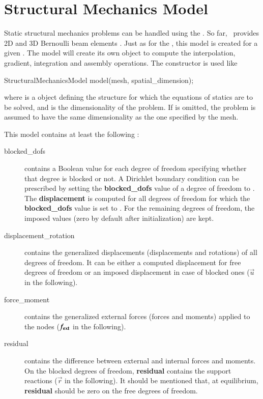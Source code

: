 \chapter{Structural  Mechanics   Model}
Static structural mechanics problems can be handled using the
.  So far, \akantu\ provides 2D and 3D
Bernoulli beam elements \cite{frey2009}.  Just as for the
, this model is created for a given
.  The model will create its own  object to
compute the interpolation, gradient, integration and assembly
operations.  The  constructor is used
like

\begin{cpp}
  StructuralMechanicsModel model(mesh, spatial_dimension);
\end{cpp}
where  is a  object defining the structure for
which the equations of statics are to be solved, and
 is the dimensionality of the problem.  If
 is omitted, the problem is assumed to have
the same dimensionality as the one specified by the mesh.



\vspace{1cm}
This model contains at least the following :
\begin{description}
\item[blocked\_dofs] contains a Boolean value for each degree of
  freedom specifying whether that degree is blocked or not. A
  Dirichlet boundary condition can be prescribed by setting the
  \textbf{blocked\_dofs} value of a degree of freedom to
  . The \textbf{displacement} is computed for all degrees
  of freedom for which the \textbf{blocked\_dofs} value is set to
  . For the remaining degrees of freedom, the imposed
  values (zero by default after initialization) are kept.



\item[displacement\_rotation] contains the generalized displacements
  (displacements and rotations) of all degrees of freedom. It can be
  either a computed displacement for free degrees of freedom or an
  imposed displacement in case of blocked ones ($\vec{u}$ in the
  following).

\item[force\_moment] contains the generalized external forces (forces
  and moments) applied to the nodes ($\boldsymbol{f_{{\mathrm{ext}}}}$ in the
  following).

\item[residual] contains the difference between external and internal
  forces and moments. On the blocked degrees of freedom,
  \textbf{residual} contains the support reactions ($\vec{r}$ in the
  following).  It should be mentioned that, at equilibrium,
  \textbf{residual} should be zero on the free degrees of freedom.
\end{description}

